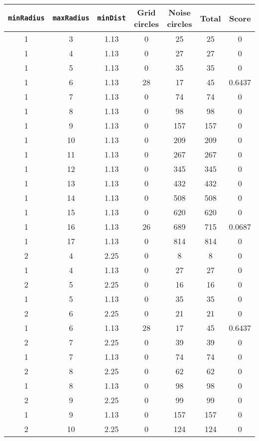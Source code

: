 \documentclass[letterpaper, 12pt]{article}
\begin{document}
\begin{longtable}{|c|c|c|c|c|c|c|}
\hline
\textbf{\texttt{minRadius}} & \textbf{\texttt{maxRadius}} & \textbf{\texttt{minDist}} & \textbf{Grid circles} & \textbf{Noise circles} & \textbf{Total} & \textbf{Score} \\
\hline
1 & 3 & 1.13 & 0 & 25 & 25 & 0 \\
\hline
1 & 4 & 1.13 & 0 & 27 & 27 & 0 \\
\hline
1 & 5 & 1.13 & 0 & 35 & 35 & 0 \\
\hline
1 & 6 & 1.13 & 28 & 17 & 45 & 0.6437 \\
\hline
1 & 7 & 1.13 & 0 & 74 & 74 & 0 \\
\hline
1 & 8 & 1.13 & 0 & 98 & 98 & 0 \\
\hline
1 & 9 & 1.13 & 0 & 157 & 157 & 0 \\
\hline
1 & 10 & 1.13 & 0 & 209 & 209 & 0 \\
\hline
1 & 11 & 1.13 & 0 & 267 & 267 & 0 \\
\hline
1 & 12 & 1.13 & 0 & 345 & 345 & 0 \\
\hline
1 & 13 & 1.13 & 0 & 432 & 432 & 0 \\
\hline
1 & 14 & 1.13 & 0 & 508 & 508 & 0 \\
\hline
1 & 15 & 1.13 & 0 & 620 & 620 & 0 \\
\hline
1 & 16 & 1.13 & 26 & 689 & 715 & 0.0687 \\
\hline
1 & 17 & 1.13 & 0 & 814 & 814 & 0 \\
\hline
2 & 4 & 2.25 & 0 & 8 & 8 & 0 \\
\hline
1 & 4 & 1.13 & 0 & 27 & 27 & 0 \\
\hline
2 & 5 & 2.25 & 0 & 16 & 16 & 0 \\
\hline
1 & 5 & 1.13 & 0 & 35 & 35 & 0 \\
\hline
2 & 6 & 2.25 & 0 & 21 & 21 & 0 \\
\hline
1 & 6 & 1.13 & 28 & 17 & 45 & 0.6437 \\
\hline
2 & 7 & 2.25 & 0 & 39 & 39 & 0 \\
\hline
1 & 7 & 1.13 & 0 & 74 & 74 & 0 \\
\hline
2 & 8 & 2.25 & 0 & 62 & 62 & 0 \\
\hline
1 & 8 & 1.13 & 0 & 98 & 98 & 0 \\
\hline
2 & 9 & 2.25 & 0 & 99 & 99 & 0 \\
\hline
1 & 9 & 1.13 & 0 & 157 & 157 & 0 \\
\hline
2 & 10 & 2.25 & 0 & 124 & 124 & 0 \\

\end{longtable}
\end{document}
